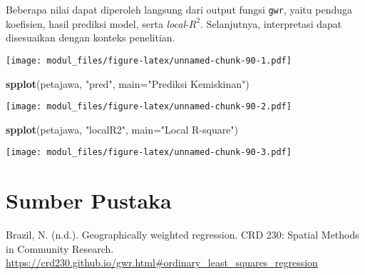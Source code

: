 \documentclass[
]{book}
\newenvironment{Shaded}{\begin{snugshade}}{\end{snugshade}}
\newcommand{\DataTypeTok}[1]{\textcolor[rgb]{0.13,0.29,0.53}{#1}}
\newcommand{\KeywordTok}[1]{\textcolor[rgb]{0.13,0.29,0.53}{\textbf{#1}}}
\newcommand{\NormalTok}[1]{#1}
\newcommand{\OperatorTok}[1]{\textcolor[rgb]{0.81,0.36,0.00}{\textbf{#1}}}
\newcommand{\StringTok}[1]{\textcolor[rgb]{0.31,0.60,0.02}{#1}}
\begin{document}
Beberapa nilai dapat diperoleh langsung dari output fungsi \texttt{gwr}, yaitu penduga koefisien, hasil prediksi model, serta \emph{local}-\(R^2\). Selanjutnya, interpretasi dapat disesuaikan dengan konteks penelitian.

\begin{Shaded}
\end{Shaded}

\texttt{[image: modul\_files/figure-latex/unnamed-chunk-90-1.pdf]}

\begin{Shaded}
\begin{Highlighting}[]
\KeywordTok{spplot}\NormalTok{(petajawa, }\StringTok{"pred"}\NormalTok{, }\DataTypeTok{main=}\StringTok{"Prediksi Kemiskinan"}\NormalTok{)}
\end{Highlighting}
\end{Shaded}

\texttt{[image: modul\_files/figure-latex/unnamed-chunk-90-2.pdf]}

\begin{Shaded}
\begin{Highlighting}[]
\KeywordTok{spplot}\NormalTok{(petajawa, }\StringTok{"localR2"}\NormalTok{, }\DataTypeTok{main=}\StringTok{"Local R{-}square"}\NormalTok{)}
\end{Highlighting}
\end{Shaded}

\texttt{[image: modul\_files/figure-latex/unnamed-chunk-90-3.pdf]}

\hypertarget{sumber-pustaka-2}{%
\section{Sumber Pustaka}\label{sumber-pustaka-2}}

Brazil, N. (n.d.). Geographically weighted regression. CRD 230: Spatial Methods in Community Research. \url{https://crd230.github.io/gwr.html\#ordinary_least_squares_regression}
\end{document}
